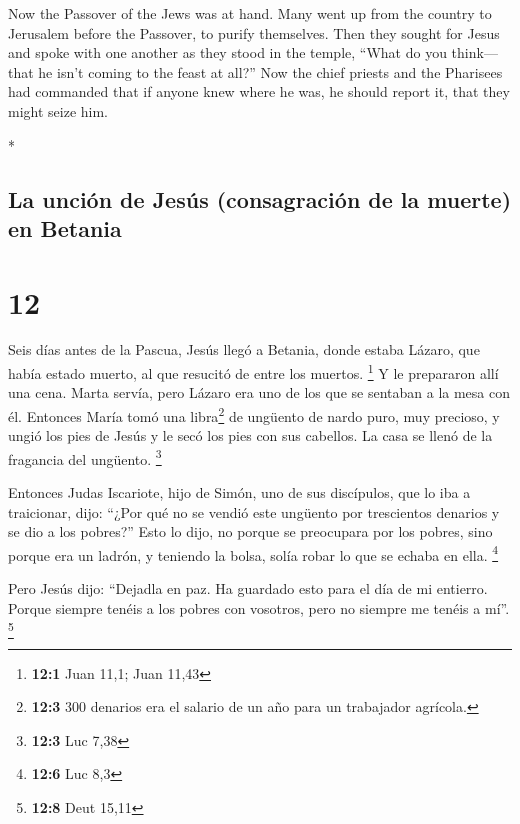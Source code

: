 \begin{paracol}{2}
\begin{otherlanguage}{english}
 Now the Passover of the Jews was at hand. Many went up
from the country to Jerusalem before the Passover, to purify themselves.
 Then they sought for Jesus and spoke with one another as
they stood in the temple, ``What do you think---that he isn't coming to
the feast at all?''  Now the chief priests and the
Pharisees had commanded that if anyone knew where he was, he should
report it, that they might seize him.

\end{otherlanguage}

\switchcolumn[0]*

\hypertarget{la-unciuxf3n-de-jesuxfas-consagraciuxf3n-de-la-muerte-en-betania}{%
\subsection{La unción de Jesús (consagración de la muerte) en
Betania}\label{la-unciuxf3n-de-jesuxfas-consagraciuxf3n-de-la-muerte-en-betania}}

\hypertarget{section-22}{%
\section{12}\label{section-22}}

 Seis días antes de la Pascua, Jesús llegó a Betania,
donde estaba Lázaro, que había estado muerto, al que resucitó de entre
los muertos. \footnote{\textbf{12:1} Juan 11,1; Juan 11,43}
 Y le prepararon allí una cena. Marta servía, pero Lázaro
era uno de los que se sentaban a la mesa con él.  Entonces
María tomó una libra\footnote{\textbf{12:3} 300 denarios era el salario
  de un año para un trabajador agrícola.} de ungüento de nardo puro, muy
precioso, y ungió los pies de Jesús y le secó los pies con sus cabellos.
La casa se llenó de la fragancia del ungüento. \footnote{\textbf{12:3}
  Luc 7,38}

 Entonces Judas Iscariote, hijo de Simón, uno de sus
discípulos, que lo iba a traicionar, dijo:  ``¿Por qué no
se vendió este ungüento por trescientos denarios y se dio a los
pobres?''  Esto lo dijo, no porque se preocupara por los
pobres, sino porque era un ladrón, y teniendo la bolsa, solía robar lo
que se echaba en ella. \footnote{\textbf{12:6} Luc 8,3}

 Pero Jesús dijo: ``Dejadla en paz. Ha guardado esto para
el día de mi entierro.  Porque siempre tenéis a los pobres
con vosotros, pero no siempre me tenéis a mí''. \footnote{\textbf{12:8}
  Deut 15,11}


\end{paracol}

